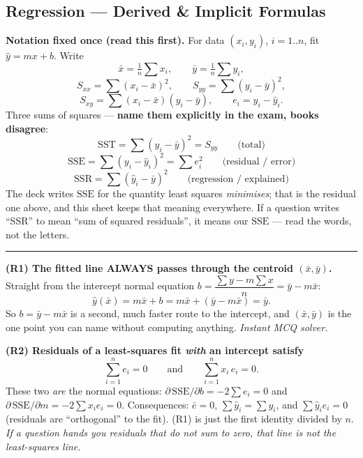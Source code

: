 
\subsection{Regression --- Derived \& Implicit Formulas}

\begin{derivedbox}
\textbf{Notation fixed once (read this first).} For data $(x_i,y_i)$, $i=1..n$, fit
$\hat y = mx+b$. Write
\[
  \bar x=\tfrac{1}{n}\textstyle\sum x_i,\qquad \bar y=\tfrac{1}{n}\textstyle\sum y_i ,
\]
\[
  S_{xx}=\textstyle\sum (x_i-\bar x)^2,\qquad
  S_{yy}=\textstyle\sum (y_i-\bar y)^2,
\]
\[
  S_{xy}=\textstyle\sum (x_i-\bar x)(y_i-\bar y),\qquad
  e_i = y_i-\hat y_i .
\]
Three sums of squares --- \textbf{name them explicitly in the exam, books disagree}:
\[
  \mathrm{SST}=\textstyle\sum (y_i-\bar y)^2 = S_{yy}
  \qquad\text{(total)}
\]
\[
  \mathrm{SSE}=\textstyle\sum (y_i-\hat y_i)^2=\textstyle\sum e_i^2
  \qquad\text{(residual / error)}
\]
\[
  \mathrm{SSR}=\textstyle\sum (\hat y_i-\bar y)^2
  \qquad\text{(regression / explained)}
\]
The deck writes $\mathrm{SSE}$ for the quantity least squares \emph{minimises}; that is
the residual one above, and this sheet keeps that meaning everywhere. If a question
writes ``SSR'' to mean ``sum of squared residuals'', it means our $\mathrm{SSE}$ ---
read the words, not the letters.

\medskip\hrule\medskip

\textbf{(R1) The fitted line ALWAYS passes through the centroid $(\bar x,\bar y)$.}
Straight from the intercept normal equation
$b=\dfrac{\sum y-m\sum x}{n}=\bar y-m\bar x$:
\[
  \hat y(\bar x)=m\bar x+b=m\bar x+(\bar y-m\bar x)=\bar y .
\]
So $b=\bar y-m\bar x$ is a second, much faster route to the intercept, and
$(\bar x,\bar y)$ is the one point you can name without computing anything.
\emph{Instant MCQ solver.}

\medskip
\textbf{(R2) Residuals of a least-squares fit \emph{with} an intercept satisfy}
\[
  \sum_{i=1}^{n} e_i = 0
  \qquad\text{and}\qquad
  \sum_{i=1}^{n} x_i\,e_i = 0 .
\]
These two \emph{are} the normal equations:
$\partial\,\mathrm{SSE}/\partial b=-2\sum e_i=0$ and
$\partial\,\mathrm{SSE}/\partial m=-2\sum x_ie_i=0$.
Consequences: $\bar e=0$, $\sum \hat y_i=\sum y_i$, and $\sum \hat y_i e_i=0$
(residuals are ``orthogonal'' to the fit). (R1) is just the first identity divided
by $n$. \emph{If a question hands you residuals that do not sum to zero, that line is
not the least-squares line.}


\end{derivedbox}
